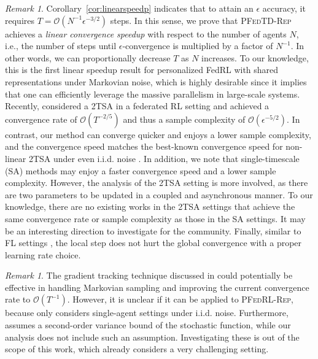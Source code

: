 \documentclass{article} %
\theoremstyle{plain}
\theoremstyle{definition}
\theoremstyle{remark}
\newtheorem{remark}[theorem]{Remark}
\newcommand{\FedRL}{\textsc{PFedRL-Rep}\xspace}
\newcommand{\FedTD}{\textsc{PFedTD-Rep}\xspace}
\begin{document}
\begin{remark}
Corollary~\ref{cor:linearspeedp} indicates that to attain an $\epsilon$ accuracy, it requires $T = \mathcal{O}\left(N^{-1}\epsilon^{-3/2}\right)$ steps.
In this sense, we prove that \FedTD achieves a \textit{linear convergence speedup} with respect to the number of agents $N$, i.e., the number of steps until $\epsilon$-convergence is multiplied by a factor of $N^{-1}$. In other words, we can proportionally decrease $T$ as $N$ increases. To our knowledge, this is the first linear speedup result for personalized FedRL with shared representations under Markovian noise, which is highly desirable since it implies that one can efficiently leverage the massive parallelism in large-scale systems. {Recently, \cite{shen2023towards} considered a 2TSA in a federated RL setting and achieved a convergence rate of $\mathcal{O}\left(T^{-2/5}\right)$ and thus a sample complexity of $\mathcal{O}\left(\epsilon^{-5/2}\right)$. In contrast, our method can converge quicker and enjoys a lower sample complexity, and the convergence speed matches the best-known convergence speed for non-linear 2TSA under even i.i.d. noise \citep{doan2022nonlinear}.
In addition, we note that single-timescale (SA) methods may enjoy a faster convergence speed and a lower sample complexity. However, the analysis of the 2TSA setting is more involved, as there are two parameters to be updated in a coupled and asynchronous manner.  To our knowledge, there are no existing works in the 2TSA settings that achieve the same convergence rate or sample complexity as those in the SA settings. It may be an interesting direction to investigate for the community. Finally, similar to FL settings \citep{collins2021exploiting}, the local step does not hurt the global convergence with a proper learning rate choice. } 
\end{remark}

\begin{remark}
The gradient tracking technique discussed in \cite{zeng2024fast} could potentially be effective in handling Markovian sampling and improving the current convergence rate to $\mathcal{O}(T^{-1})$. However, it is unclear if it can be applied to \FedRL, because \cite{zeng2024fast} only considers single-agent settings under i.i.d. noise. Furthermore, \cite{zeng2024fast} assumes a second-order variance bound of the stochastic function, while our analysis does not include such an assumption. Investigating these is out of the scope of this work, which already considers a very challenging setting. 
\end{remark}
\end{document}
